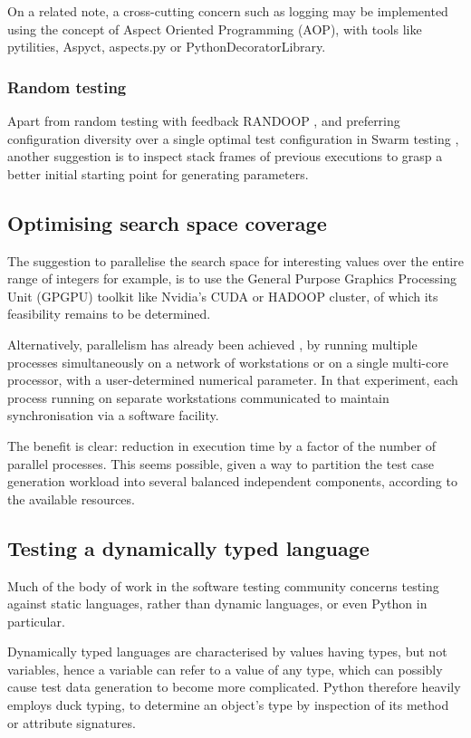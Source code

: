 \documentclass{icldt}
\numberwithin{equation}{section}       %
\begin{document}
{On a related note, a cross-cutting concern such as logging may be implemented using the concept of Aspect Oriented Programming (AOP), with tools like \textsf{pytilities}, \textsf{Aspyct}, \textsf{aspects.py} or \textsf{PythonDecoratorLibrary}.

\subsubsection{Random testing}
Apart from random testing with feedback RANDOOP \cite{Pacheco2007}, and preferring configuration diversity over a single optimal test configuration in Swarm testing \cite{AlexGroceSep2011}, another suggestion is to inspect stack frames of previous executions to grasp a better initial starting point for generating parameters.
\subsection{Optimising search space coverage}
The suggestion to parallelise the search space for interesting values over the entire range of integers for example, is to use the General Purpose Graphics Processing Unit (GPGPU) toolkit like Nvidia's CUDA or HADOOP cluster, of which its feasibility remains to be determined.

Alternatively, parallelism has already been achieved \cite{Pargas99}, by running multiple processes simultaneously on a network of workstations or on a single multi-core processor, with a user-determined numerical parameter. In that experiment, each process running on separate workstations communicated to maintain synchronisation via a software facility.

The benefit is clear: reduction in execution time by a factor of the number of parallel processes. This seems possible, given a way to partition the test case generation workload into several balanced independent components, according to the available resources.
\subsection{Testing a dynamically typed language}
Much of the body of work in the software testing community concerns testing against static languages, rather than dynamic languages, or even Python in particular.

Dynamically typed languages are characterised by values having types, but not variables, hence a variable can refer to a value of any type, which can possibly cause test data generation to become more complicated. Python therefore heavily employs duck typing, to determine an object's type by inspection of its method or attribute signatures.

}
\end{document}
